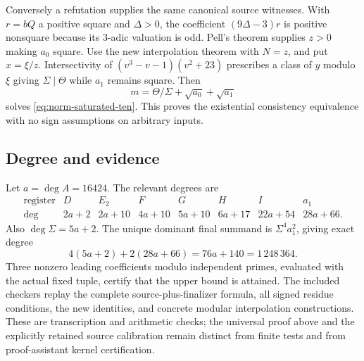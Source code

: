 Conversely a refutation supplies the same canonical source witnesses.
With $r=bQ$ a positive square and $\Delta>0$, the coefficient
$(9\Delta-3)r$ is positive nonsquare because its $3$-adic valuation is
odd. Pell's theorem supplies $z>0$ making $a_0$ square. Use the new
interpolation theorem with $N=z$, and put $x=\xi/z$.
Intersectivity of $(v^3-v-1)(v^2+23)$ prescribes a class of $y$ modulo
$\xi$ giving $\Sigma\mid\Theta$ while $a_1$ remains square.
Then
\[
 m=\Theta/\Sigma+\sqrt{a_0}+\sqrt{a_1}
\]
solves \eqref{eq:norm-saturated-ten}. This proves the existential
consistency equivalence with no sign assumptions on arbitrary inputs.

\subsection{Degree and evidence}

Let $a=\deg A=16424$. The relevant degrees are
\[
\begin{array}{c|rrrrrrr}
 \text{register}&D&E_2&F&G&H&I&a_1\\\hline
 \deg&2a+2&2a+10&4a+10&5a+10&6a+17&22a+54&28a+66.
\end{array}
\]
Also $\deg\Sigma=5a+2$. The unique dominant final summand is
$\Sigma^4a_1^2$, giving exact degree
\[
 4(5a+2)+2(28a+66)=76a+140=1\,248\,364.
\]
Three nonzero leading coefficients modulo independent primes, evaluated
with the actual fixed tuple, certify that the upper bound is attained.
The included checkers replay the complete source-plus-finalizer formula,
all signed residue conditions, the new identities, and concrete modular
interpolation constructions. These are transcription and arithmetic
checks; the universal proof above and the explicitly retained source
calibration remain distinct from finite tests and from proof-assistant
kernel certification.
